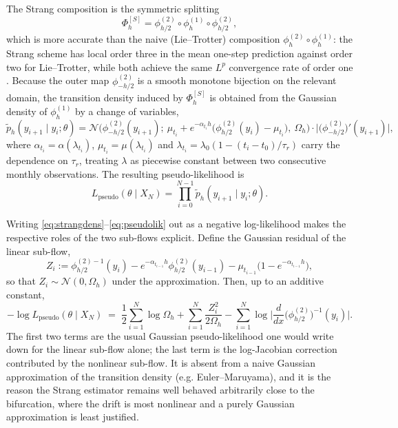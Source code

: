 \documentclass[12pt,a4paper]{article}
\theoremstyle{definition}
\theoremstyle{plain}
\begin{document}
\noindent The Strang composition is the symmetric splitting
\[
\Phi^{[S]}_h=\phi^{(2)}_{h/2}\circ\phi^{(1)}_{h}\circ\phi^{(2)}_{h/2},
\]
which is more accurate than the naive (Lie--Trotter) composition
$\phi^{(2)}_h\circ\phi^{(1)}_h$: the Strang scheme has local order three in the mean one-step
prediction against order two for Lie--Trotter, while both achieve the same $L^p$ convergence
rate of order one \cite{pilipovic2024}. Because the outer map $\phi^{(2)}_{-h/2}$ is a smooth
monotone bijection on the relevant domain, the transition density induced by $\Phi^{[S]}_h$ is
obtained from the Gaussian density of $\phi^{(1)}_h$ by a change of variables,
\begin{equation}
\label{eq:strangdens}
\tilde p_h(y_{i+1}\mid y_i;\theta)=
\mathcal{N}\Big(\phi^{(2)}_{-h/2}(y_{i+1});\ \mu_{t_i}+e^{-\alpha_{t_i}h}
\big(\phi^{(2)}_{h/2}(y_i)-\mu_{t_i}\big),\ \Omega_h\Big)\cdot
\Big|\big(\phi^{(2)}_{-h/2}\big)'(y_{i+1})\Big| ,
\end{equation}
where $\alpha_{t_i}=\alpha(\lambda_{t_i})$, $\mu_{t_i}=\mu(\lambda_{t_i})$ and
$\lambda_{t_i}=\lambda_0(1-(t_i-t_0)/\tau_r)$ carry the dependence on $\tau_r$, treating
$\lambda$ as piecewise constant between two consecutive monthly observations. The resulting
pseudo-likelihood is
\begin{equation}
\label{eq:pseudolik}
L_{\mathrm{pseudo}}(\theta\mid X_N)=\prod_{i=0}^{N-1}\tilde p_h(y_{i+1}\mid y_i;\theta) .
\end{equation}
 
\noindent Writing \eqref{eq:strangdens}--\eqref{eq:pseudolik} out as a negative log-likelihood makes the
respective roles of the two sub-flows explicit. Define the Gaussian residual of the linear
sub-flow,
\[
Z_i:=\phi^{(2)-1}_{h/2}(y_{i})-e^{-\alpha_{t_{i-1}}h}\phi^{(2)}_{h/2}(y_{i-1})
-\mu_{t_{i-1}}\big(1-e^{-\alpha_{t_{i-1}}h}\big) ,
\]
so that $Z_i\sim\mathcal N(0,\Omega_h)$ under the approximation. Then, up to an additive
constant,
\begin{equation}
\label{eq:strangobj}
-\log L_{\mathrm{pseudo}}(\theta\mid X_N)\;=\;
\frac12\sum_{i=1}^{N}\log\Omega_h
+\sum_{i=1}^{N}\frac{Z_i^2}{2\Omega_h}
-\sum_{i=1}^{N}\log\Big| \frac{d}{dx} \big(\phi^{(2)}_{h/2}\big)^{-1}(y_i)\Big| .
\end{equation}
The first two terms are the usual Gaussian pseudo-likelihood one would write down for the
linear sub-flow alone; the last term is the log-Jacobian correction contributed by the
nonlinear sub-flow. It is absent from a naive Gaussian approximation of the transition density
(e.g. Euler--Maruyama), and it is the reason the Strang estimator remains well behaved
arbitrarily close to the bifurcation, where the drift is most nonlinear and a purely Gaussian
approximation is least justified.



\end{document}
